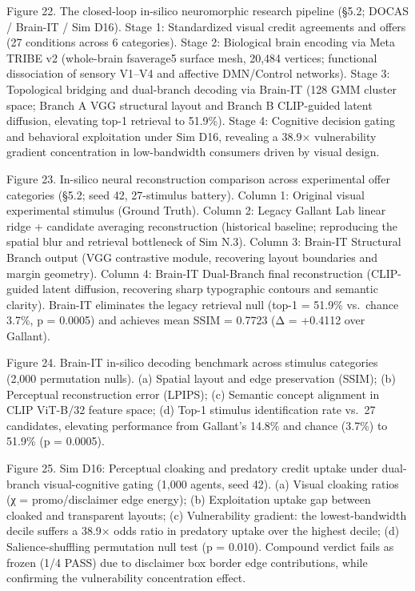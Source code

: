 \documentclass[
]{article}
\begin{document}
Figure 22. The closed-loop in-silico neuromorphic research pipeline
(§5.2; DOCAS / Brain-IT / Sim D16). Stage 1: Standardized visual credit
agreements and offers (27 conditions across 6 categories). Stage 2:
Biological brain encoding via Meta TRIBE v2 (whole-brain fsaverage5
surface mesh, 20,484 vertices; functional dissociation of sensory V1--V4
and affective DMN/Control networks). Stage 3: Topological bridging and
dual-branch decoding via Brain-IT (128 GMM cluster space; Branch A VGG
structural layout and Branch B CLIP-guided latent diffusion, elevating
top-1 retrieval to 51.9\%). Stage 4: Cognitive decision gating and
behavioral exploitation under Sim D16, revealing a {38.9×} vulnerability
gradient concentration in low-bandwidth consumers driven by visual
design.

Figure 23. In-silico neural reconstruction comparison across
experimental offer categories (§5.2; seed 42, 27-stimulus battery).
Column 1: Original visual experimental stimulus (Ground Truth). Column
2: Legacy Gallant Lab linear ridge + candidate averaging reconstruction
(historical baseline; reproducing the spatial blur and retrieval
bottleneck of Sim N.3). Column 3: Brain-IT Structural Branch output (VGG
contrastive module, recovering layout boundaries and margin geometry).
Column 4: Brain-IT Dual-Branch final reconstruction (CLIP-guided latent
diffusion, recovering sharp typographic contours and semantic clarity).
Brain-IT eliminates the legacy retrieval null ({top-1 = 51.9\%}
vs.~chance {3.7\%}, {p = 0.0005}) and achieves mean {SSIM = 0.7723}
({Δ = +0.4112} over Gallant).

Figure 24. Brain-IT in-silico decoding benchmark across stimulus
categories (2,000 permutation nulls). (a) Spatial layout and edge
preservation (SSIM); (b) Perceptual reconstruction error (LPIPS); (c)
Semantic concept alignment in CLIP ViT-B/32 feature space; (d) Top-1
stimulus identification rate vs.~27 candidates, elevating performance
from Gallant's 14.8\% and chance (3.7\%) to 51.9\% ({p = 0.0005}).

Figure 25. Sim D16: Perceptual cloaking and predatory credit uptake
under dual-branch visual-cognitive gating (1,000 agents, seed 42). (a)
Visual cloaking ratios ({χ} = promo/disclaimer edge energy); (b)
Exploitation uptake gap between cloaked and transparent layouts; (c)
Vulnerability gradient: the lowest-bandwidth decile suffers a {38.9×}
odds ratio in predatory uptake over the highest decile; (d)
Salience-shuffling permutation null test ({p = 0.010}). Compound verdict
fails as frozen (1/4 PASS) due to disclaimer box border edge
contributions, while confirming the vulnerability concentration effect.
\end{document}
